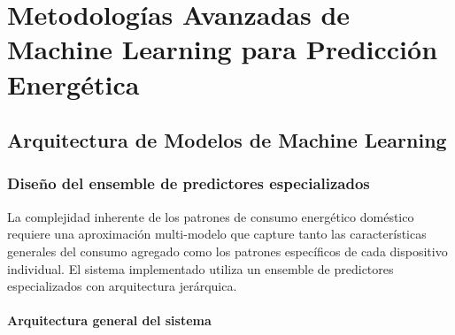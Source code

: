 \chapter{Metodologías Avanzadas de Machine Learning para Predicción Energética}
\label{ch:machine_learning}

\section{Arquitectura de Modelos de Machine Learning}

\subsection{Diseño del ensemble de predictores especializados}

La complejidad inherente de los patrones de consumo energético doméstico requiere una aproximación multi-modelo que capture tanto las características generales del consumo agregado como los patrones específicos de cada dispositivo individual. El sistema implementado utiliza un ensemble de predictores especializados con arquitectura jerárquica.

\subsubsection{Arquitectura general del sistema}

